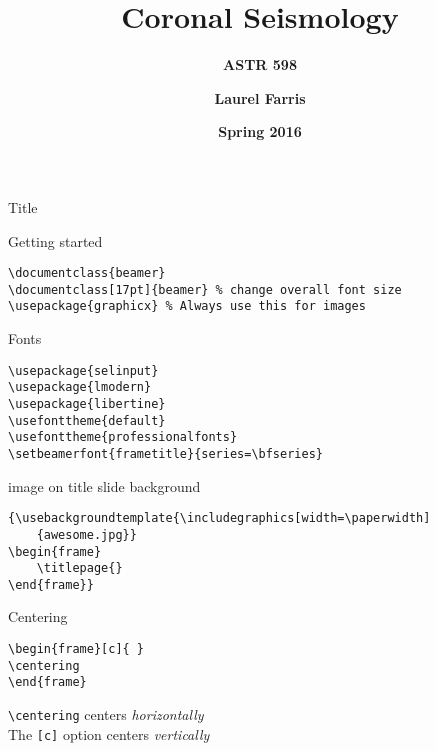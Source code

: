 \documentclass[9pt]{beamer}
\title{\textbf{Coronal Seismology}}
\subtitle{\textbf{ASTR 598}}
\date{\textbf{Spring 2016}}
\author{\textbf{Laurel Farris}}
\begin{document}
\begin{frame}[fragile=singleslide]{Title}
\end{frame}%
\begin{frame}[fragile=singleslide]{Getting started}
\begin{verbatim}
\documentclass{beamer}
\documentclass[17pt]{beamer} % change overall font size
\usepackage{graphicx} % Always use this for images
\end{verbatim}
\end{frame}%
\begin{frame}[fragile=singleslide]{Fonts}
\begin{verbatim}
\usepackage{selinput}
\usepackage{lmodern}
\usepackage{libertine}
\usefonttheme{default}
\usefonttheme{professionalfonts}
\setbeamerfont{frametitle}{series=\bfseries}
\end{verbatim}
\end{frame}%
\begin{frame}{image on title slide background}
\begin{verbatim}
{\usebackgroundtemplate{\includegraphics[width=\paperwidth]
    {awesome.jpg}}
\begin{frame}
    \titlepage{}
\end{frame}}
\end{verbatim}
\end{frame}%
\begin{frame}[fragile=singleslide]{Centering}
    \begin{verbatim}
\begin{frame}[c]{ }
\centering
\end{frame}
    \end{verbatim}

\verb|\centering| centers \emph{horizontally}\\
The \verb|[c]| option centers \emph{vertically}
\end{frame}%
\end{document}
